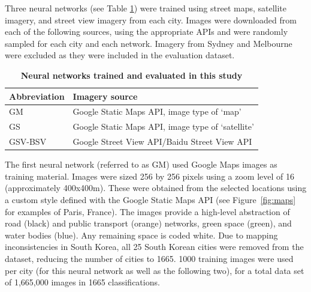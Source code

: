 \documentclass[Crown,sageh,times]{sagej}
\begin{document}
Three neural networks (see Table \ref{tab:neuralnetworks}) were trained using street maps, satellite imagery, and street view imagery from each city. Images were downloaded from each of the following sources, using the appropriate APIs and were randomly sampled for each city and each network. Imagery from Sydney and Melbourne were excluded as they were included in the evaluation dataset. 


\begin{table}[!htbp]
\caption{\bf Neural networks trained and evaluated in this study \label{tab:neuralnetworks}}     
\begin{tabular}{ l l }
 \hline Abbreviation   &  Imagery source \\ \hline
GM & Google Static Maps API, image type of `map'     \\ 
GS & Google Static Maps API, image type of `satellite'      \\
GSV-BSV & Google Street View API/Baidu Street View API     \\ \hline

\end{tabular}
\end{table}

The first neural network (referred to as GM) used Google Maps images as training material. Images were sized 256 by 256 pixels using a zoom level of 16 (approximately 400x400m). These were obtained from the selected locations using a custom style defined with the Google Static Maps API \citep{GoogleStatic2017} (see Figure~\ref{fig:maps} for examples of Paris, France). The images provide a high-level abstraction of road (black) and public transport (orange) networks, green space (green), and water bodies (blue). Any remaining space is coded white. Due to mapping inconsistencies in South Korea, all 25 South Korean cities were removed from the dataset, reducing the number of cities to 1665. 1000 training images were used per city (for this neural network as well as the following two), for a total data set of 1,665,000 images in 1665 classifications. 
\end{document}
